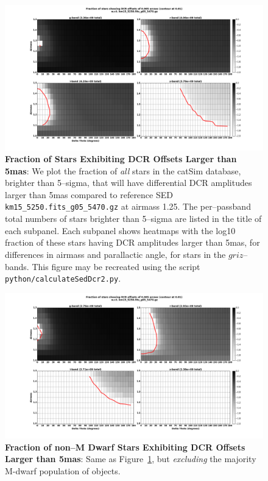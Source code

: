 \documentclass[DM,toc]{lsstdoc}
\begin{document}
\begin{figure}[!t]
  \centering
  \includegraphics[width=1.1\textwidth]{calculateSedDcr2.png}
  \caption{\textbf{Fraction of Stars Exhibiting DCR Offsets Larger than
      5mas}: We plot the fraction of \emph{all} stars in the catSim
    database, brighter than 5--sigma, that will have differential DCR
    amplitudes larger than 5mas compared to reference SED
    \texttt{km15\_5250.fits\_g05\_5470.gz} at airmass 1.25.  The
    per--passband total numbers of stars brighter than 5--sigma are
    listed in the title of each subpanel.  Each subpanel shows
    heatmaps with the log10 fraction of these stars having DCR
    amplitudes larger than 5mas, for differences in airmass and
    parallactic angle, for stars in the $griz$--bands.  This figure
    may be recreated using the script
    \texttt{python/calculateSedDcr2.py}.}
  \label{fig:dcr}
\end{figure}

\begin{figure}[!t]
  \centering
  \includegraphics[width=1.1\textwidth]{calculateSedDcr2M.png}
  \caption{\textbf{Fraction of non--M Dwarf Stars Exhibiting DCR Offsets
      Larger than 5mas}: Same as Figure~\ref{fig:dcr}, but
      \emph{excluding} the majority M-dwarf population of objects.}
  \label{fig:dcrnoM}
\end{figure}
\end{document}
